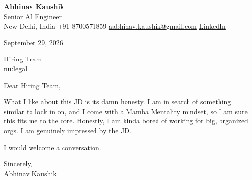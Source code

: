 \documentclass[11pt,a4paper]{article}
\begin{document}
{\Large\bfseries Abhinav Kaushik}\\
Senior AI Engineer\\
New Delhi, India \textbar{} +91 8700571859 \textbar{} \href{mailto:aabhinav.kaushik@gmail.com}{aabhinav.kaushik@gmail.com} \textbar{} \href{https://www.linkedin.com/in/abhinav-kaushik10/}{LinkedIn}  

September 29, 2026

Hiring Team\\
nu:legal

Dear Hiring Team,

What I like about this JD is its damn honesty. I am in search of something similar to lock in on, and I come with a Mamba Mentality mindset, so I am sure this fits me to the core. Honestly, I am kinda bored of working for big, organized orgs. I am genuinely impressed by the JD.

I would welcome a conversation.

Sincerely,\\[4pt]
Abhinav Kaushik
\end{document}
